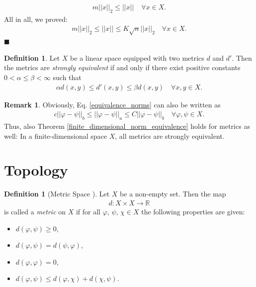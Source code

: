 \documentclass[12pt, a4paper]{article}
\numberwithin{equation}{section}
\theoremstyle{definition}
\theoremstyle{definition}
\newtheorem{defn}[thm]{Definition} %
\newtheorem{remark}[thm]{Remark} %
\newcommand{\norm}[2]{\left\vert\left\vert #1 \right\vert\right\vert_{#2}}
\begin{document}
	\begin{align}
		m\norm{x}{2} \leq \norm{x}{} \quad \forall x\in X.
	\end{align}
	All in all, we proved: 
	\begin{align}
		m\norm{x}{2} \leq \norm{x}{} \leq K\sqrt{n}\norm{x}{2} \quad \forall x\in X. 
	\end{align}
	\qquad\qquad\qquad\qquad\qquad\qquad\qquad\qquad\qquad\qquad\qquad\qquad\qquad\qquad\qquad\qquad\qquad\qquad\qquad\qquad\qquad\quad$\blacksquare$
	
	\begin{defn}\label{defn:strong_equivalence}
		Let $X$ be a linear space equipped with two metrics $d$ and $d'$. Then the metrics are \textit{strongly equivalent} if and only if there exist positive constants $0 < \alpha \leq \beta < \infty$ such that 
		\begin{align}
			\alpha d(x, y) \leq d'(x, y) \leq \beta d(x, y) \quad\forall x, y\in X. 
		\end{align}
		\cite{equivalence-metrics}
	\end{defn}
	
	\begin{remark}\label{equivalence_metrics_finite_dimensional}
		Obviously, Eq. \eqref{equivalence_norms} can also be written as 
		\begin{align}
			c\norm{\varphi-\psi}{b} \leq \norm{\varphi-\psi}{a} \leq C\norm{\varphi-\psi}{b} \quad \forall \varphi, \psi\in X. 
		\end{align} 
		Thus, also Theorem \ref{finite_dimensional_norm_equivalence} holds for metrics as well: In a finite-dimensional space $X$, all metrics are strongly equivalent. 
	\end{remark}
	
	\newpage 
	\section{Topology}
	\begin{defn}[Metric Space \cite{fa2019}]\label{defn:metric_space}
		Let $X$ be a non-empty set. Then the map 
		\begin{align*}
			d: X\times X\rightarrow \mathbb R
		\end{align*}
		is called a \textit{metric} on $X$ if for all $\varphi$, $\psi$, $\chi\in X$ the following properties are given: 
		\begin{itemize}
			\item $d(\varphi, \psi) \geq 0$, 
			\item $d(\varphi, \psi) = d(\psi, \varphi)$, 
			\item $d(\varphi, \varphi) = 0$, 
			\item $d(\varphi, \psi) \leq d(\varphi, \chi) + d(\chi, \psi)$. 
		\end{itemize}
	\end{defn}
\end{document}
